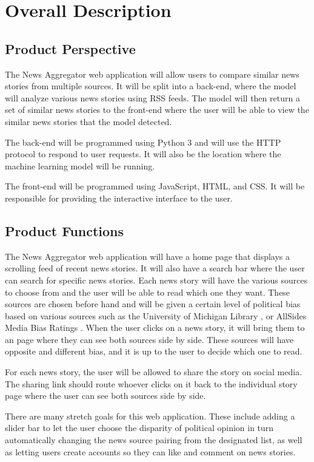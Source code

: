 \documentclass[onecolumn, draftclsnofoot,10pt, compsoc]{IEEEtran}
\begin{document}
\section{Overall Description}
\subsection{Product Perspective}
The News Aggregator web application will allow users to compare similar news stories from multiple sources. It will be split into a back-end, where the model will analyze various news stories using RSS feeds. The model will then return a set of similar news stories to the front-end where the user will be able to view the similar news stories that the model detected.\par
The back-end will be programmed using Python 3 and will use the HTTP protocol to respond to user requests. It will also be the location where the machine learning model will be running.\par
The front-end will be programmed using JavaScript, HTML, and CSS. It will be responsible for providing the interactive interface to the user.
\subsection{Product Functions}
The News Aggregator web application will have a home page that displays a scrolling feed of recent news stories. It will also have a search bar where the user can search for specific news stories. Each news story will have the various sources to choose from and the user will be able to read which one they want. These sources are chosen before hand and will be given a certain level of political bias based on various sources such as the University of Michigan Library \cite{mich_news_bias}, or AllSides Media Bias Ratings \cite{all_sides_bias}. When the user clicks on a news story, it will bring them to an page where they can see both sources side by side. These sources will have opposite and different bias, and it is up to the user to decide which one to read.\par
For each news story, the user will be allowed to share the story on social media. The sharing link should route whoever clicks on it back to the individual story page where the user can see both sources side by side.\par
There are many stretch goals for this web application. These include adding a slider bar to let the user choose the disparity of political opinion in turn automatically changing the news source pairing from the designated list, as well as letting users create accounts so they can like and comment on news stories.
\end{document}
